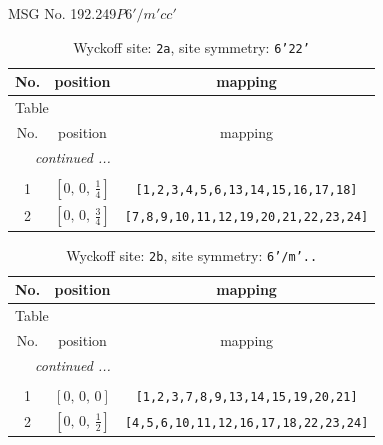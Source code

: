 \documentclass[fleqn,8pt]{jsarticle}
\begin{document}
\setcounter{MaxMatrixCols}{32}

\renewcommand{\tablename}{Table~}
\renewcommand{\figurename}{Figure~}
\begin{center}
\LARGE
MSG No. 192.249\quad$P6'/m'cc'$
\end{center}
\renewcommand{\arraystretch}{1.2}
\begin{longtable}{ccc}
\caption{Wyckoff site: {\tt 2a}, site symmetry: {\tt 6'22'}}
 \\
 \hline \hline
No. & position & mapping \\ \hline \endfirsthead

\multicolumn{2}{l}{\tablename\ \thetable{}} \\
 \hline \hline
No. & position & mapping \\ \hline \endhead

 \hline \hline
\multicolumn{2}{r}{\footnotesize\it continued ...} \\ \endfoot

 \hline \hline
\multicolumn{2}{r}{} \\ \endlastfoot

1 & $\left[ 0,\, 0,\, \frac{1}{4} \right]$ & {\tt [1,2,3,4,5,6,13,14,15,16,17,18]} \\ \hline
2 & $\left[ 0,\, 0,\, \frac{3}{4} \right]$ & {\tt [7,8,9,10,11,12,19,20,21,22,23,24]} \\
\end{longtable}
\renewcommand{\arraystretch}{1.2}
\begin{longtable}{ccc}
\caption{Wyckoff site: {\tt 2b}, site symmetry: {\tt 6'/m'..}}
 \\
 \hline \hline
No. & position & mapping \\ \hline \endfirsthead

\multicolumn{2}{l}{\tablename\ \thetable{}} \\
 \hline \hline
No. & position & mapping \\ \hline \endhead

 \hline \hline
\multicolumn{2}{r}{\footnotesize\it continued ...} \\ \endfoot

 \hline \hline
\multicolumn{2}{r}{} \\ \endlastfoot

1 & $\left[ 0,\, 0,\, 0 \right]$ & {\tt [1,2,3,7,8,9,13,14,15,19,20,21]} \\ \hline
2 & $\left[ 0,\, 0,\, \frac{1}{2} \right]$ & {\tt [4,5,6,10,11,12,16,17,18,22,23,24]} \\
\end{longtable}
\end{document}

